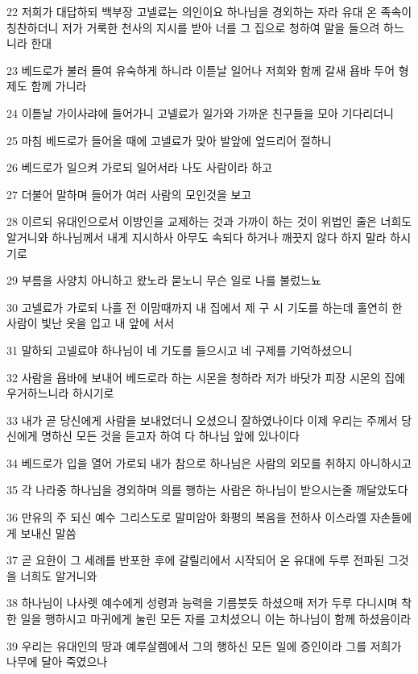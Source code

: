 \par 22 저희가 대답하되 백부장 고넬료는 의인이요 하나님을 경외하는 자라 유대 온 족속이 칭찬하더니 저가 거룩한 천사의 지시를 받아 너를 그 집으로 청하여 말을 들으려 하느니라 한대
\par 23 베드로가 불러 들여 유숙하게 하니라 이튿날 일어나 저희와 함께 갈새 욥바 두어 형제도 함께 가니라
\par 24 이튿날 가이사랴에 들어가니 고넬료가 일가와 가까운 친구들을 모아 기다리더니
\par 25 마침 베드로가 들어올 때에 고넬료가 맞아 발앞에 엎드리어 절하니
\par 26 베드로가 일으켜 가로되 일어서라 나도 사람이라 하고
\par 27 더불어 말하며 들어가 여러 사람의 모인것을 보고
\par 28 이르되 유대인으로서 이방인을 교제하는 것과 가까이 하는 것이 위법인 줄은 너희도 알거니와 하나님께서 내게 지시하사 아무도 속되다 하거나 깨끗지 않다 하지 말라 하시기로
\par 29 부름을 사양치 아니하고 왔노라 묻노니 무슨 일로 나를 불렀느뇨
\par 30 고넬료가 가로되 나흘 전 이맘때까지 내 집에서 제 구 시 기도를 하는데 홀연히 한 사람이 빛난 옷을 입고 내 앞에 서서
\par 31 말하되 고넬료야 하나님이 네 기도를 들으시고 네 구제를 기억하셨으니
\par 32 사람을 욥바에 보내어 베드로라 하는 시몬을 청하라 저가 바닷가 피장 시몬의 집에 우거하느니라 하시기로
\par 33 내가 곧 당신에게 사람을 보내었더니 오셨으니 잘하였나이다 이제 우리는 주께서 당신에게 명하신 모든 것을 듣고자 하여 다 하나님 앞에 있나이다
\par 34 베드로가 입을 열어 가로되 내가 참으로 하나님은 사람의 외모를 취하지 아니하시고
\par 35 각 나라중 하나님을 경외하며 의를 행하는 사람은 하나님이 받으시는줄 깨달았도다
\par 36 만유의 주 되신 예수 그리스도로 말미암아 화평의 복음을 전하사 이스라엘 자손들에게 보내신 말씀
\par 37 곧 요한이 그 세례를 반포한 후에 갈릴리에서 시작되어 온 유대에 두루 전파된 그것을 너희도 알거니와
\par 38 하나님이 나사렛 예수에게 성령과 능력을 기름붓듯 하셨으매 저가 두루 다니시며 착한 일을 행하시고 마귀에게 눌린 모든 자를 고치셨으니 이는 하나님이 함께 하셨음이라
\par 39 우리는 유대인의 땅과 예루살렘에서 그의 행하신 모든 일에 증인이라 그를 저희가 나무에 달아 죽였으나
